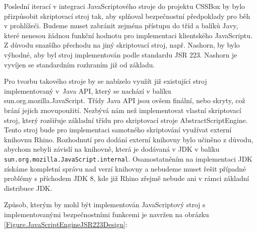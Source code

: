 Poslední iterací v integraci JavaScriptového stroje do projektu CSSBox by bylo přizpůsobit skriptovací stroj tak, aby splňoval bezpečnostní předpoklady pro běh v prohlížeči. Budeme muset zabránit zejména přístupu do tříd a balíků Javy, které nenesou žádnou funkční hodnotu pro implementaci klientského JavaScriptu. Z důvodu snazšího přechodu na jiný skriptovací stroj, např. Nashorn, by bylo výhodné, aby byl stroj implementován podle standardu JSR 223. Nashorn je vyvíjen se standardním rozhraním již od základu.

Pro tvorbu takového stroje by se nabízelo využít již existující stroj implementovaný v~Java API, který se nachází v balíku sun.org.mozilla.JavaScript. Třídy Java API jsou ovšem finální, nebo skryty, což brání jejich znovupoužití. Nezbývá nám než implementovat vlastní skriptovací stroj, který rozšiřuje základní třídu pro skriptovací stroje AbstractScriptEngine. Tento stroj bude pro implementaci samotného skriptování využívat externí knihovnu Rhino. Rozhodnutí pro dodání externí knihovny bylo učiněno z důvodu, abychom nebyli závislí na knihovně, která je dodávaná v JDK v balíku \texttt{sun.org.mozilla.JavaScript.internal}. Osamostatněním na implementaci JDK získáme kompletní správu nad verzí knihovny a nebudeme muset řešit případné problémy s příchodem JDK 8, kde již Rhino zřejmě nebude ani v rámci základní distribuce JDK.

Způsob, kterým by mohl být implementován JavaScriptový stroj s implementovanými bezpečnostními funkcemi je navržen na obrázku \ref{Figure.JavaScriptEngineJSR223Design}:

